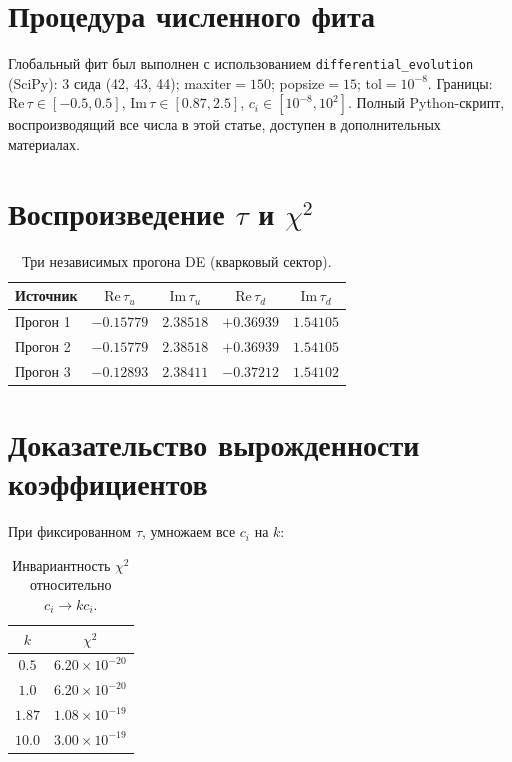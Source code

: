 \documentclass[12pt,a4paper]{article}
\numberwithin{equation}{section}
\begin{document}
\section{Процедура численного фита}
Глобальный фит был выполнен с использованием \texttt{differential\_evolution} (SciPy):
3 сида (42, 43, 44); maxiter$=150$; popsize$=15$; tol$=10^{-8}$.
Границы: $\mathrm{Re}\,\tau \in [-0.5, 0.5]$, $\mathrm{Im}\,\tau \in [0.87, 2.5]$, $c_i \in [10^{-8}, 10^2]$.
Полный Python-скрипт, воспроизводящий все числа в этой статье, доступен в дополнительных материалах.

\section{Воспроизведение $\tau$ и $\chi^2$}
\begin{table}[H]
\centering
\caption{Три независимых прогона DE (кварковый сектор).}
\begin{tabular}{lcccc}
\toprule
Источник & $\mathrm{Re}\,\tau_u$ & $\mathrm{Im}\,\tau_u$ & $\mathrm{Re}\,\tau_d$ & $\mathrm{Im}\,\tau_d$ \\
\midrule
Прогон 1 & $-0.15779$ & $2.38518$ & $+0.36939$ & $1.54105$ \\
Прогон 2 & $-0.15779$ & $2.38518$ & $+0.36939$ & $1.54105$ \\
Прогон 3 & $-0.12893$ & $2.38411$ & $-0.37212$ & $1.54102$ \\
\bottomrule
\end{tabular}
\end{table}

\section{Доказательство вырожденности коэффициентов}
При фиксированном $\tau$, умножаем все $c_i$ на $k$:
\begin{table}[H]
\centering
\caption{Инвариантность $\chi^2$ относительно $c_i \to k c_i$.}
\begin{tabular}{cc}
\toprule
$k$ & $\chi^2$ \\
\midrule
$0.5$  & $6.20\times10^{-20}$ \\
$1.0$  & $6.20\times10^{-20}$ \\
$1.87$ & $1.08\times10^{-19}$ \\
$10.0$ & $3.00\times10^{-19}$ \\
\bottomrule
\end{tabular}
\end{table}
\end{document}
